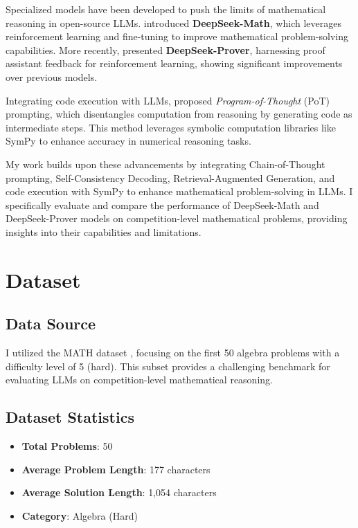 \documentclass[11pt,a4paper]{article}
\begin{document}
Specialized models have been developed to push the limits of mathematical reasoning in open-source LLMs. \citet{shao2024deepseekmathpushinglimitsmathematical} introduced \textbf{DeepSeek-Math}, which leverages reinforcement learning and fine-tuning to improve mathematical problem-solving capabilities. More recently, \citet{xin2024deepseekproverv15harnessingproofassistant} presented \textbf{DeepSeek-Prover}, harnessing proof assistant feedback for reinforcement learning, showing significant improvements over previous models.

Integrating code execution with LLMs, \citet{chen2023programthoughtspromptingdisentangling} proposed \textit{Program-of-Thought} (PoT) prompting, which disentangles computation from reasoning by generating code as intermediate steps. This method leverages symbolic computation libraries like SymPy \cite{meurer2017sympy} to enhance accuracy in numerical reasoning tasks.

My work builds upon these advancements by integrating Chain-of-Thought prompting, Self-Consistency Decoding, Retrieval-Augmented Generation, and code execution with SymPy to enhance mathematical problem-solving in LLMs. I specifically evaluate and compare the performance of DeepSeek-Math and DeepSeek-Prover models on competition-level mathematical problems, providing insights into their capabilities and limitations.

\section{Dataset}
\subsection{Data Source}
I utilized the MATH dataset \cite{hendrycks2021measuringmathematicalproblemsolving}, focusing on the first 50 algebra problems with a difficulty level of 5 (hard). This subset provides a challenging benchmark for evaluating LLMs on competition-level mathematical reasoning.

\subsection{Dataset Statistics}
\begin{itemize}[noitemsep,nolistsep]
    \item \textbf{Total Problems}: 50
    \item \textbf{Average Problem Length}: 177 characters
    \item \textbf{Average Solution Length}: 1,054 characters
    \item \textbf{Category}: Algebra (Hard)
\end{itemize}
\end{document}
